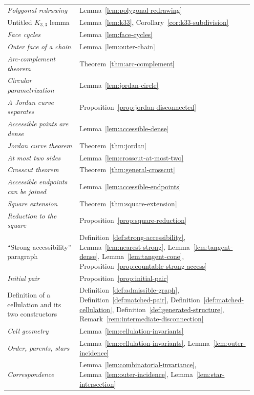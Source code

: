 \documentclass[11pt]{article}
\theoremstyle{mainplain}
\theoremstyle{mainroman}
\theoremstyle{definition}
\numberwithin{equation}{section}
\begin{document}
\begin{longtable}{@{}p{}p{}@{}}
\emph{Polygonal redrawing} & Lemma~\ref{lem:polygonal-redrawing} \\
Untitled $K_{3,3}$ lemma & Lemma~\ref{lem:k33}, Corollary~\ref{cor:k33-subdivision} \\
\emph{Face cycles} & Lemma~\ref{lem:face-cycles} \\
\emph{Outer face of a chain} & Lemma~\ref{lem:outer-chain} \\
\emph{Arc-complement theorem} & Theorem~\ref{thm:arc-complement} \\
\emph{Circular parametrization} & Lemma~\ref{lem:jordan-circle} \\
\emph{A Jordan curve separates} & Proposition~\ref{prop:jordan-disconnected} \\
\emph{Accessible points are dense} & Lemma~\ref{lem:accessible-dense} \\
\emph{Jordan curve theorem} & Theorem~\ref{thm:jordan} \\
\emph{At most two sides} & Lemma~\ref{lem:crosscut-at-most-two} \\
\emph{Crosscut theorem} & Theorem~\ref{thm:general-crosscut} \\
\emph{Accessible endpoints can be joined} & Lemma~\ref{lem:accessible-endpoints} \\
\emph{Square extension} & Theorem~\ref{thm:square-extension} \\
\emph{Reduction to the square} & Proposition~\ref{prop:square-reduction} \\
``Strong accessibility'' paragraph & Definition~\ref{def:strong-accessibility}, Lemma~\ref{lem:nearest-strong}, Lemma~\ref{lem:tangent-dense}, Lemma~\ref{lem:tangent-cone}, Proposition~\ref{prop:countable-strong-access} \\
\emph{Initial pair} & Proposition~\ref{prop:initial-pair} \\
Definition of a cellulation and its two constructors & Definition~\ref{def:admissible-graph}, Definition~\ref{def:matched-pair}, Definition~\ref{def:matched-cellulation}, Definition~\ref{def:generated-structure}, Remark~\ref{rem:intermediate-disconnection} \\
\emph{Cell geometry} & Lemma~\ref{lem:cellulation-invariants} \\
\emph{Order, parents, stars} & Lemma~\ref{lem:cellulation-invariants}, Lemma~\ref{lem:outer-incidence} \\
\emph{Correspondence} & Lemma~\ref{lem:combinatorial-invariance}, Lemma~\ref{lem:outer-incidence}, Lemma~\ref{lem:star-intersection} \\

\end{longtable}
\end{document}
